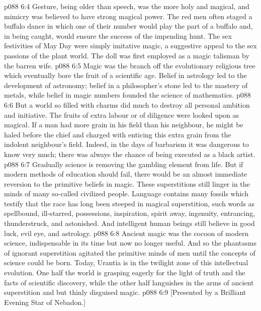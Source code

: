\vs p088 6:4 Gesture, being older than speech, was the more holy and magical, and mimicry was believed to have strong magical power. The red men often staged a buffalo dance in which one of their number would play the part of a buffalo and, in being caught, would ensure the success of the impending hunt. The sex festivities of May Day were simply imitative magic, a suggestive appeal to the sex passions of the plant world. The doll was first employed as a magic talisman by the barren wife.
\vs p088 6:5 \pc Magic was the branch off the evolutionary religious tree which eventually bore the fruit of a scientific age. Belief in astrology led to the development of astronomy; belief in a philosopher’s stone led to the mastery of metals, while belief in magic numbers founded the science of mathematics.
\vs p088 6:6 \pc But a world so filled with charms did much to destroy all personal ambition and initiative. The fruits of extra labour or of diligence were looked upon as magical. If a man had more grain in his field than his neighbour, he might be haled before the chief and charged with enticing this extra grain from the indolent neighbour’s field. Indeed, in the days of barbarism it was dangerous to know very much; there was always the chance of being executed as a black artist.
\vs p088 6:7 Gradually science is removing the gambling element from life. But if modern methods of education should fail, there would be an almost immediate reversion to the primitive beliefs in magic. These superstitions still linger in the minds of many so\hyp{}called civilized people. Language contains many fossils which testify that the race has long been steeped in magical superstition, such words as spellbound, ill\hyp{}starred, possessions, inspiration, spirit away, ingenuity, entrancing, thunderstruck, and astonished. And intelligent human beings still believe in good luck, evil eye, and astrology.
\vs p088 6:8 Ancient magic was the cocoon of modern science, indispensable in its time but now no longer useful. And so the phantasms of ignorant superstition agitated the primitive minds of men until the concepts of science could be born. Today, Urantia is in the twilight zone of this intellectual evolution. One half the world is grasping eagerly for the light of truth and the facts of scientific discovery, while the other half languishes in the arms of ancient superstition and but thinly disguised magic.
\vsetoff
\vs p088 6:9 [Presented by a Brilliant Evening Star of Nebadon.]
\quizlink
